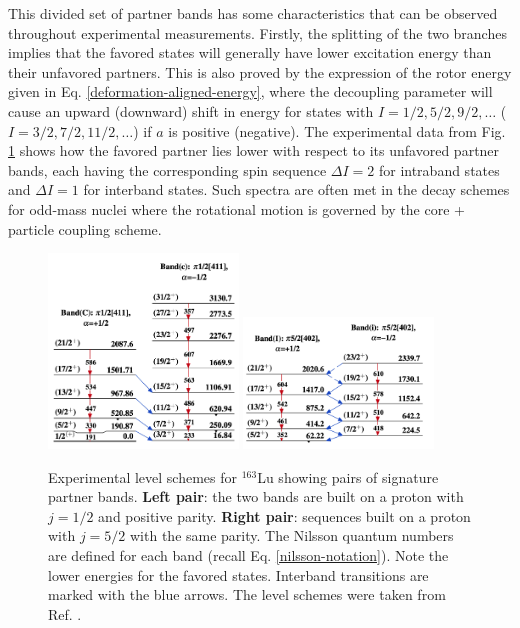 This divided set of partner bands has some characteristics that can be observed throughout experimental measurements. Firstly, the splitting of the two branches implies that the favored states will generally have lower excitation energy than their unfavored partners. This is also proved by the expression of the rotor energy given in Eq. \eqref{deformation-aligned-energy}, where the decoupling parameter will cause an upward (downward) shift in energy for states with $I=1/2,5/2,9/2,\dots$ ($I=3/2,7/2,11/2,\dots$) if $a$ is positive (negative). The experimental data from Fig. \ref{level-scheme-signature-splitting} shows how the favored partner lies lower with respect to its unfavored partner bands, each having the corresponding spin sequence $\Delta I=2$ for intraband states and $\Delta I=1$ for interband states. Such spectra are often met in the decay schemes for odd-mass nuclei where the rotational motion is governed by the core + particle coupling scheme.
\begin{figure}
    \centering
    \includegraphics[width=0.45\textwidth]{Chapters/Figures/Lu_163_K12-band.png}
    \includegraphics[width=0.45\textwidth]{Chapters/Figures/Lu_163_signatureSplitting.png}
    \caption{Experimental level schemes for $^{163}$Lu showing pairs of signature partner bands. \textbf{Left pair}: the two bands are built on a proton with $j=1/2$ and positive parity. \textbf{Right pair}: sequences built on a proton with $j=5/2$ with the same parity. The Nilsson quantum numbers are defined for each band (recall Eq. \eqref{nilsson-notation}). Note the lower energies for the favored states. Interband transitions are marked with the blue arrows. The level schemes were taken from Ref. \cite{bhat1992evaluated}.%
    }
    \label{level-scheme-signature-splitting}
\end{figure}
